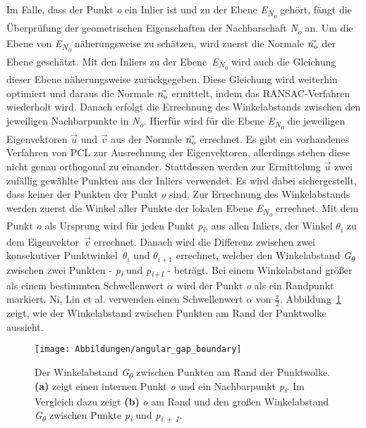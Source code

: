 Im Falle, dass der Punkt \textit{o} ein Inlier ist und zu der Ebene \textit{E\textsubscript{N\textsubscript{o}}} gehört, fängt die Überprüfung der geometrischen Eigenschaften der Nachbarschaft \textit{N\textsubscript{o}} an. Um die Ebene von \textit{E\textsubscript{N\textsubscript{o}}} näherungsweise zu schätzen, wird zuerst die Normale \textit{$\vec{n\textsubscript{o}}$} der Ebene geschätzt. Mit den Inliers zu der Ebene~\textit{E\textsubscript{N\textsubscript{o}}} wird auch die Gleichung dieser Ebene näherungsweise zurückgegeben. Diese Gleichung wird weiterhin optimiert und daraus die Normale \textit{$\vec{n\textsubscript{o}}$} ermittelt, indem das RANSAC-Verfahren wiederholt wird. Danach erfolgt die Errechnung des Winkelabstands zwischen den jeweiligen Nachbarpunkte in \textit{N\textsubscript{o}}. Hierfür wird für die Ebene \textit{E\textsubscript{N\textsubscript{o}}} die jeweiligen Eigenvektoren $\vec{u}$ und $\vec{v}$ aus der Normale $\vec{n\textsubscript{o}}$ errechnet. Es gibt ein vorhandenes Verfahren von PCL zur Ausrechnung der Eigenvektoren, allerdings stehen diese nicht genau orthogonal zu einander. Stattdessen werden zur Ermittelung \textit{$\vec{u}$} zwei zufällig gewählte Punkten aus der Inliers verwendet. Es wird dabei sichergestellt, dass keiner der Punkten der Punkt \textit{o} sind. Zur Errechnung des Winkelabstands werden zuerst die Winkel aller Punkte der lokalen Ebene \textit{E\textsubscript{N\textsubscript{o}}} errechnet. Mit dem Punkt \textit{o} als Ursprung wird für jeden Punkt \textit{p\textsubscript{i}}, aus allen Inliers, der Winkel \textit{$\theta_i$} zu dem Eigenvektor~$\vec{v}$ errechnet. Danach wird die Differenz zwischen zwei konsekutiver Punktwinkel~$\theta_i$ und $\theta_{i+1}$ errechnet, welcher den Winkelabstand \textit{G\textsubscript{$\theta$}} zwischen zwei Punkten - \textit{p\textsubscript{i}} und \textit{p\textsubscript{i+1}} - beträgt. Bei einem Winkelabstand größer als einem bestimmten Schwellenwert $\alpha$ wird der Punkt \textit{o} als ein Randpunkt markiert. Ni, Lin et al. verwenden einen Schwellenwert $\alpha$ von $\frac{\pi}{2}$. Abbildung~\ref{edge_boundary} zeigt, wie der Winkelabstand zwischen Punkten am Rand der Punktwolke aussieht.

\begin{figure}[t]
	\texttt{[image: Abbildungen/angular\_gap\_boundary]}
	\centering
	\caption[Visualisierung des Winkelabstandes zwischen Punkten]{Der Winkelabstand \textit{G\textsubscript{$\theta$}} zwischen Punkten am Rand der Punktwolke. \textbf{(a)} zeigt einen internen Punkt \textit{o} und ein Nachbarpunkt \textit{p\textsubscript{i}}. Im Vergleich dazu zeigt \textbf{(b)} \textit{o} am Rand und den großen Winkelabstand \textit{G\textsubscript{$\theta$}} zwischen Punkte \textit{p\textsubscript{i}} und \textit{p\textsubscript{i + 1}}. \autocite{ni_edge_2016}}
	\label{edge_boundary}
\end{figure}

